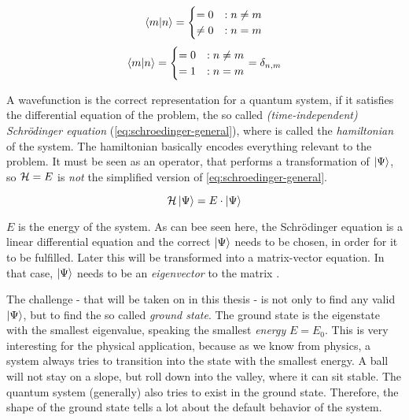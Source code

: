 \begin{equation}
    \label{eq:base-orthagonal}
    \bra{m}\ket{n} = \begin{cases}
         = 0 &: n\neq m\\
         \neq 0 &: n = m
    \end{cases}
\end{equation}
\begin{equation}
    \label{eq:base-orthonormal}
    \bra{m}\ket{n} = \begin{cases}
         = 0 &: n\neq m\\
         = 1 &: n = m
    \end{cases} = \delta_{n, m}
\end{equation}

A wavefunction is the correct representation for a quantum system, if it satisfies the differential equation of the problem, the so called \emph{(time-independent) Schrödinger equation} (\autoref{eq:schroedinger-general}), where \hamiltonian is called the \emph{hamiltonian} of the system. The hamiltonian basically \glqq encodes\grqq{} everything relevant to the problem. It must be seen as an operator, that performs a transformation of $\ket{\Psi}$, so $\mathcal{H} = E$ is \emph{not} the simplified version of \autoref{eq:schroedinger-general}.

\begin{equation}
    \label{eq:schroedinger-general}
    \mathcal{H} \ket{\Psi} = E \cdot \ket{\Psi}
\end{equation}

$E$ is the energy of the system. As can bee seen here, the Schrödinger equation is a linear differential equation and the correct $\ket{\Psi}$ needs to be chosen, in order for it to be fulfilled. Later this will be transformed into a matrix-vector equation. In that case, $\ket{\Psi}$ needs to be an \emph{eigenvector} to the matrix \hamiltonian.

The challenge - that will be taken on in this thesis - is not only to find any valid $\ket{\Psi}$, but to find the so called \emph{ground state}. The ground state is the eigenstate with the smallest eigenvalue, speaking the smallest \emph{energy} $E = E_0$. 
This is very interesting for the physical application, because as we know from physics, a system always tries to transition into the state  with the smallest energy. A ball will not stay on a slope, but roll down into the valley, where it can sit stable. The quantum system (generally) also tries to exist in the ground state. Therefore, the shape of the ground state tells a lot about the \glqq default\grqq{} behavior of the system.